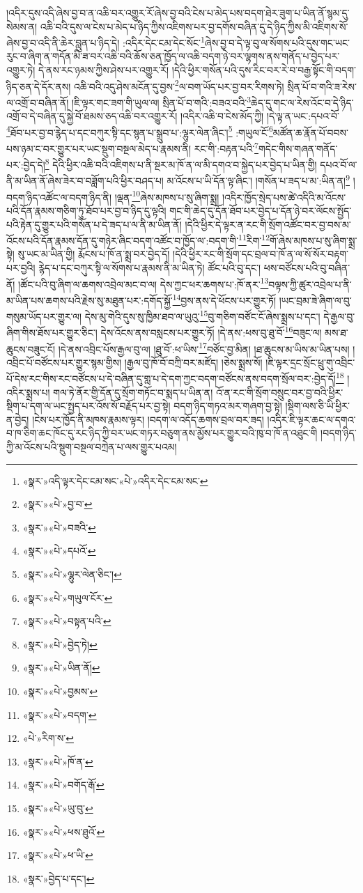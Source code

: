 །འདིར་དུས་འདི་ཞེས་བྱ་བ་ན་འཆི་བར་འགྱུར་རོ་ཞེས་བྱ་བའི་ངེས་པ་མེད་པས་བདག་ཐེར་ཟུག་པ་ཡིན་ནོ་སྙམ་དུ་སེམས་ན། འཆི་བའི་དུས་ལ་ངེས་པ་མེད་པ་ཉིད་ཀྱིས་འཇིགས་པར་བྱ་དགོས་བཞིན་དུ་དེ་ཉིད་ཀྱིས་མི་འཇིགས་སོ་ཞེས་བྱ་བ་འདི་ནི་ཆེར་བླུན་པ་ཉིད་དེ། :འདིར་དེང་ངམ་དེང་སོང་\footnote{«སྣར་»འདི་ལྟར་དེང་ངམ་སང་«པེ་»འདིར་དེང་ངམ་སང་}ཞེས་བྱ་བ་དེ་ལྟ་བུ་ལ་སོགས་པའི་དུས་གང་ཡང་རུང་བ་ཞིག་ན་གདོན་མི་ཟ་བར་འཆི་བའི་ཆོས་ཅན་ཁྱོད་ལ་འཆི་བདག་ཉེ་བར་ལྷགས་ནས་གནོད་པ་བྱེད་པར་འགྱུར་ཏེ། དེ་ནས་རང་ཉམས་ཀྱིས་ཤེས་པར་འགྱུར་རོ། །དེའི་ཕྱིར་གསོན་པའི་དུས་རིང་བར་རེ་བ་བརྒྱ་སྟོང་གི་བདག་ཉིད་ཅན་དེ་དོར་ནས། འཆི་བའི་འདུ་ཤེས་མངོན་དུ་བྱས་\footnote{«སྣར་»«པེ་»བྱ་བ་}ལ་བག་ཡོད་པར་བྱ་བར་རིགས་ཏེ། སྲིན་པོ་བ་གའི་ཟ་རེས་ལ་འགྲོ་བ་བཞིན་ནོ། །ཇི་ལྟར་གང་ཟག་གི་ཡུལ་ལ། སྲིན་པོ་བ་གའི་:བཟའ་བའི་\footnote{«སྣར་»«པེ་»བཟའི་}ཆེད་དུ་གང་ལ་རེས་འོང་བ་དེ་ཉིད་འགྲོ་བ་དེ་བཞིན་དུ་སྐྱེ་བོ་ཐམས་ཅད་འཆི་བར་འགྱུར་རོ། །འདིར་འཆི་བ་ངེས་མོད་ཀྱི། །དེ་ལྟ་ན་ཡང་:དཔའ་བོ་\footnote{«སྣར་»«པེ་»དཔའོ་}ཐོབ་པར་བྱ་བ་རྙེད་པ་དང་བཀུར་སྟི་དང་སྙན་པ་སྒྲུབ་པ་:ལྷུར་ལེན་ཞིང་།\footnote{«སྣར་»«པེ་»ལྷུར་ལེན་ཅིང་།} :གཡུལ་ངོ་\footnote{«སྣར་»«པེ་»གཡུལ་ངོར་}མཚོན་ཆ་རྣོན་པོ་བབས་པས་ཉམ་ང་བར་གྱུར་པར་ཡང་སྡུག་བསྔལ་མེད་པ་རྣམས་ནི། རང་གི་:བརྟན་པའི་\footnote{«སྣར་»«པེ་»བསྟན་པའི་}གདེང་གིས་གཞན་གནོད་པར་:བྱེད་དེ།\footnote{«སྣར་»«པེ་»བྱེད་ཏེ།} དེའི་ཕྱིར་འཆི་བའི་འཇིགས་པ་ནི་སྔར་མ་ཁོ་ན་ལ་མི་དགའ་བ་སྐྱེད་པར་བྱེད་པ་ཡིན་གྱི། དཔའ་བོ་ལ་ནི་མ་ཡིན་ནོ་ཞེས་ཟེར་བ་བཟློག་པའི་ཕྱིར་བཤད་པ། མ་འོངས་པ་ཡི་དོན་ལྟ་ཞིང་། །གསོན་པ་ཟད་པ་མ་:ཡིན་ན།\footnote{«སྣར་»«པེ་»ཡིན་ནོ།} །བདག་ཉིད་འཚོང་ལ་བདག་ཉིད་ནི། །ལྡན་\footnote{«སྣར་»«པེ་»བྱམས་}ཞེས་མཁས་པ་སུ་ཞིག་སྨྲ། །འདིར་ཁྱོད་སྲེད་པས་ཚེ་འདིའི་མ་འོངས་པའི་དོན་རྣམས་གཅིག་ཏུ་ཐོབ་པར་བྱ་བ་ཉིད་དུ་ལྟའི། གང་གི་ཆེད་དུ་དོན་ཐོབ་པར་བྱེད་པ་དོན་ཉེ་བར་ལོངས་སྤྱོད་པའི་རྟེན་དུ་གྱུར་པའི་གསོན་པ་དེ་ཟད་པ་ལ་ནི་མ་ཡིན་ནོ། །དེའི་ཕྱིར་དེ་ལྟར་ན་རང་གི་སྲོག་འཚོང་བར་བྱ་བས་མ་འོངས་པའི་དོན་རྣམས་དོན་དུ་གཉེར་ཞིང་བདག་འཚོང་བ་ཁྱོད་ལ་:བདག་གི་\footnote{«སྣར་»«པེ་»བདག་}རིག་\footnote{«པེ་»རིག་ས་}གོ་ཞེས་མཁས་པ་སུ་ཞིག་སྨྲ་སྟེ། སུ་ཡང་མ་ཡིན་གྱི། རྨོངས་པ་ཁོ་ན་སྨྲ་བར་བྱེད་དོ། །དེའི་ཕྱིར་རང་གི་སྲོག་དང་བྲལ་བ་ཁོ་ན་ལ་སོ་སོར་བརྟག་པར་བྱའི། རྙེད་པ་དང་བཀུར་སྟི་ལ་སོགས་པ་རྣམས་ནི་མ་ཡིན་ཏེ། ཚོང་པའི་བུ་དང་། ཕས་བཙོངས་པའི་བུ་བཞིན་ནོ། །ཚོང་པའི་བུ་ཞིག་ལ་ཆགས་འབྲེལ་མང་བ་ལ། དེས་ཀྱང་ཕར་ཆགས་པ་:ཁོ་ནར་\footnote{«སྣར་»«པེ་»ཁོ་ན་}བལྟས་ཀྱི་ཚུར་འབྲེལ་པ་ནི་མ་ཡིན་པས་ཆགས་པའི་རྗེས་སུ་མཐུན་པར་:དགོད་སྐྱོ་\footnote{«སྣར་»«པེ་»བགོད་རྒོ་}བྱས་ནས་དེ་ཕོངས་པར་གྱུར་ཏོ། །ཡང་བྲམ་ཟེ་ཞིག་ལ་བུ་གསུམ་ཡོད་པར་གྱུར་ལ། དེས་མུ་གེའི་དུས་སུ་ཁྱིམ་ཐབ་ལ་ཡུའུ་\footnote{«སྣར་»«པེ་»ཡུ་བུ་}བུ་གཅིག་བཙོང་ངོ་ཞེས་སྨྲས་པ་དང་། དེ་རྒྱལ་བུ་ཞིག་གིས་ཐོས་པར་གྱུར་ཅིང་། དེས་འོངས་ནས་བསླངས་པར་གྱུར་ཏོ། །དེ་ནས་:ཕས་བུ་ཐུ་བོ་\footnote{«སྣར་»«པེ་»ཕས་ཐུའོ་}བཟུང་ལ། མས་ཐ་ཆུངས་བཟུང་ངོ། །དེ་ནས་འབྲིང་པོས་རྒྱལ་བུ་ལ། །ཐུ་བོ་:ཕ་ཡིས་\footnote{«སྣར་»«པེ་»ཕ་ཡི་}བཙོང་བྱ་མིན། །ཐ་ཆུངས་མ་ཡིས་མ་ཡིན་པས། །འབྲིང་པོ་བཙོངས་པར་གྱུར་སྙམ་གྱིས། །རྒྱལ་བུ་ཁོ་བོ་བཀྲི་བར་མཛོད། །ཅེས་སྨྲས་སོ། །ཇི་ལྟར་དྲང་སྲོང་ཕྲུ་གུ་འབྲིང་པོ་དེས་རང་གིས་རང་བཙོངས་པ་དེ་བཞིན་དུ་གླ་པ་དེ་དག་ཀྱང་བདག་བཙོངས་ནས་བདག་སྲོལ་བར་:བྱེད་དོ།\footnote{«སྣར་»བྱེད་པ་དང་།} །འདིར་སྨྲས་པ། གལ་ཏེ་ནོར་གྱི་དོན་དུ་སྲོག་གཏོང་བ་སྨད་པ་ཡིན་ན། འོ་ན་རང་གི་སྲོག་བསྲུང་བར་བྱ་བའི་ཕྱིར་སྡིག་པ་དག་ལ་ཡང་སྤྱད་པར་འོས་སོ་བརྗོད་པར་བྱ་སྟེ། བདག་ཉིད་གཏའ་མར་གཞག་བྱ་སྟེ། །སྡིག་ལས་ཅི་ཡི་ཕྱིར་ན་བྱེད། །ངེས་པར་ཁྱོད་ནི་མཁས་རྣམས་ལྟར། །བདག་ལ་འདོད་ཆགས་བྲལ་བར་ཟད། །འདིར་ཇི་ལྟར་ཆང་ལ་དགའ་བ་ཁ་ཅིག་ཆང་ཁོང་དུ་རང་ཉིད་ཀྱི་བར་ཡང་གཏར་བཅུག་ནས་མྱོས་པར་གྱུར་བའི་ཁུ་བ་ཁོ་ན་འཐུང་གི །བདག་ཉིད་ཀྱི་མ་འོངས་པའི་སྡུག་བསྔལ་བཀྲེན་པ་ལས་གྱུར་པའམ། 